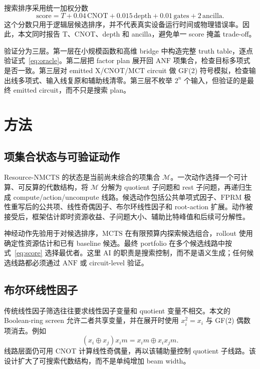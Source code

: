 \documentclass[UTF8,fontset=macnew,11pt]{ctexart}
\newcommand{\method}{Resource-NMCTS}
\newcommand{\anf}{\ensuremath{\mathrm{ANF}}}
\newcommand{\fprm}{\ensuremath{\mathrm{FPRM}}}
\newcommand{\mcts}{\ensuremath{\mathrm{MCTS}}}
\newcommand{\xor}{\ensuremath{\oplus}}
\newcommand{\mct}{\ensuremath{\mathrm{MCT}}}
\newcommand{\score}{\ensuremath{\mathrm{score}}}
\newcommand{\ttable}{truth table}
\begin{document}
搜索排序采用统一加权分数
\begin{equation}
  \score = T + 0.04\,\mathrm{CNOT} + 0.015\,\mathrm{depth}
         + 0.01\,\mathrm{gates} + 2\,\mathrm{ancilla}.
  \label{eq:score}
\end{equation}
这个分数只用于逻辑层候选排序，并不代表真实设备运行时间或物理错误率。因此，本文同时报告 T、CNOT、depth 和 ancilla，避免单一 score 掩盖 trade-off。

验证分为三层。第一层在小规模函数和高维 bridge 中构造完整 \ttable{}，逐点验证式~\eqref{eq:oracle}。第二层把 factor plan 展开回 \anf{} 项集合，检查目标多项式是否一致。第三层对 emitted X/CNOT/\mct{} circuit 做 GF(2) 符号模拟，检查输出线多项式、输入线复原和辅助线清零。第三层不枚举 $2^n$ 个输入，但验证的是最终 emitted circuit，而不只是搜索 plan。

\section{方法}

\subsection{项集合状态与可验证动作}

\method{} 的状态是当前尚未综合的项集合 $\mathcal{M}$。一次动作选择一个可计算、可反算的代数结构，将 $\mathcal{M}$ 分解为 quotient 子问题和 rest 子问题，再递归生成 compute/action/uncompute 线路。候选动作包括公共单项式因子、\fprm{} 极性重写后的公共项、线性奇偶因子、布尔环线性因子和 root-action 扩展。动作被接受后，框架估计即时资源收益、子问题大小、辅助比特峰值和后续可分解性。

神经动作先验用于对候选排序，\mcts{} 在有限预算内探索候选组合，rollout 使用确定性资源估计和已有 baseline 候选。最终 portfolio 在多个候选线路中按式~\eqref{eq:score} 选择最优者。这里 AI 的职责是搜索控制，而不是语义生成；任何候选线路都必须通过 \anf{} 或 circuit-level 验证。

\subsection{布尔环线性因子}

传统线性因子筛选往往要求线性因子变量和 quotient 变量不相交。本文的 Boolean-ring screen 允许二者共享变量，并在展开时使用 $x_i^2=x_i$ 与 GF(2) 偶数项消去。例如
\begin{equation}
  (x_i\xor x_j)x_i m = x_i m \xor x_i x_j m .
  \label{eq:boolean-ring}
\end{equation}
线路层面仍可用 CNOT 计算线性奇偶量，再以该辅助量控制 quotient 子线路。该设计扩大了可搜索代数结构，而不是单纯增加 beam width。
\end{document}
